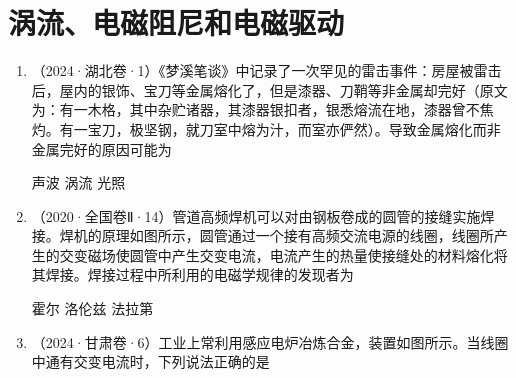 \documentclass[\gkver]{gaokaozhenti}
\newcommand{\source}[1]{{\sffamily（#1）}}
\begin{document}
\section{涡流、电磁阻尼和电磁驱动}
\begin{enumerate}[resume]
\item
\source{2024·湖北卷·1}《梦溪笔谈》中记录了一次罕见的雷击事件：房屋被雷击后，屋内的银饰、宝刀等金属熔化了，但是漆器、刀鞘等非金属却完好（原文为：有一木格，其中杂贮诸器，其漆器银扣者，银悉熔流在地，漆器曾不焦灼。有一宝刀，极坚钢，就刀室中熔为汁，而室亦俨然）。导致金属熔化而非金属完好的原因可能为  

{声波}
{涡流}
{光照}


\item
\source{2020·全国卷Ⅱ·14}管道高频焊机可以对由钢板卷成的圆管的接缝实施焊接。焊机的原理如图所示，圆管通过一个接有高频交流电源的线圈，线圈所产生的交变磁场使圆管中产生交变电流，电流产生的热量使接缝处的材料熔化将其焊接。焊接过程中所利用的电磁学规律的发现者为


{霍尔}
{洛伦兹}
{法拉第}

\item
\source{2024·甘肃卷·6}工业上常利用感应电炉冶炼合金，装置如图所示。当线圈中通有交变电流时，下列说法正确的是


\end{enumerate}
\end{document}

